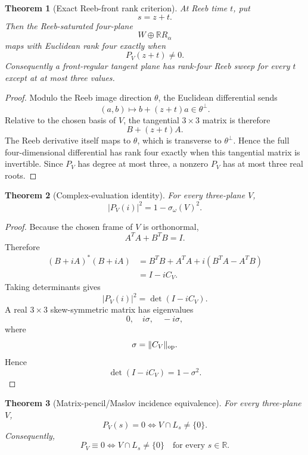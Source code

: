 \documentclass[10pt]{article}
\newtheorem{theorem}{Theorem}[section]
\newcommand{\R}{\mathbb R}
\begin{document}
\begin{theorem}[Exact Reeb-front rank criterion]
\label{thm:v003-rank-criterion}
At Reeb time \(t\), put
\[
s=z+t.
\]
Then the Reeb-saturated four-plane
\[
W\oplus\R R_\alpha
\]
maps with Euclidean rank four exactly when
\begin{equation}
\label{eq:v003-rank-criterion}
\boxed{
P_V(z+t)\neq0.
}
\end{equation}
Consequently a front-regular tangent plane has rank-four Reeb sweep for every \(t\) except at at
most three values.
\end{theorem}

\begin{proof}
Modulo the Reeb image direction \(\theta\), the Euclidean differential sends
\[
(a,b)\longmapsto b+(z+t)a
\in\theta^\perp.
\]
Relative to the chosen basis of \(V\), the tangential \(3\times3\) matrix is therefore
\[
B+(z+t)A.
\]
The Reeb derivative itself maps to \(\theta\), which is transverse to \(\theta^\perp\).  Hence the
full four-dimensional differential has rank four exactly when this tangential matrix is invertible.
Since \(P_V\) has degree at most three, a nonzero \(P_V\) has at most three real roots.
\end{proof}

\begin{theorem}[Complex-evaluation identity]
\label{thm:v003-complex-identity}
For every three-plane \(V\),
\begin{equation}
\label{eq:v003-complex-identity}
\boxed{
|P_V(i)|^2
=
1-\sigma_\omega(V)^2.
}
\end{equation}
\end{theorem}

\begin{proof}
Because the chosen frame of \(V\) is orthonormal,
\[
A^TA+B^TB=I.
\]
Therefore
\[
\begin{aligned}
(B+iA)^*(B+iA)
&=
B^TB+A^TA+i(B^TA-A^TB)\\
&=
I-iC_V.
\end{aligned}
\]
Taking determinants gives
\[
|P_V(i)|^2
=
\det(I-iC_V).
\]
A real \(3\times3\) skew-symmetric matrix has eigenvalues
\[
0,\quad i\sigma,\quad -i\sigma,
\]
where
\[
\sigma=\|C_V\|_{\rm op}.
\]
Hence
\[
\det(I-iC_V)
=
1-\sigma^2.
\]
\end{proof}

\begin{theorem}[Matrix-pencil/Maslov incidence equivalence]
\label{thm:v003-maslov-equivalence}
For every three-plane \(V\),
\begin{equation}
\label{eq:v003-maslov-equivalence}
\boxed{
P_V(s)=0
\iff
V\cap L_s\neq\{0\}.
}
\end{equation}
Consequently,
\begin{equation}
\label{eq:v003-total-trap}
\boxed{
P_V\equiv0
\iff
V\cap L_s\neq\{0\}
\quad\text{for every }s\in\R.
}
\end{equation}
\end{theorem}
\end{document}
